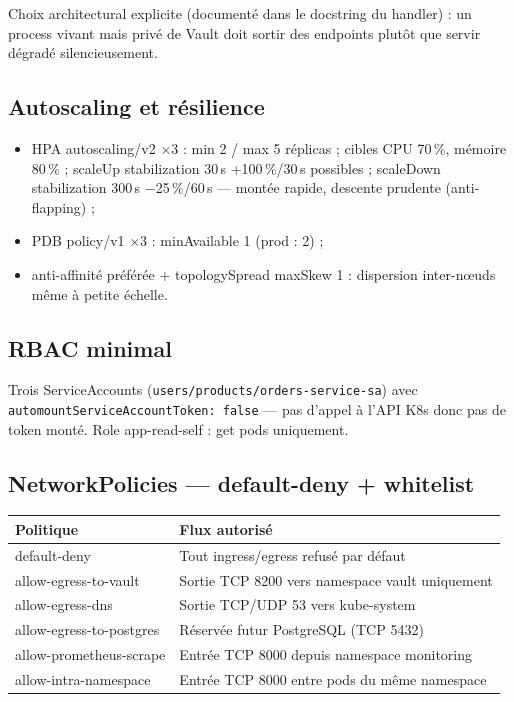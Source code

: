 \documentclass[12pt,a4paper]{article}
\begin{document}
Choix architectural explicite (documenté dans le docstring du handler) : un process vivant mais privé de Vault doit sortir des endpoints plutôt que servir dégradé silencieusement.

\subsection{Autoscaling et résilience}
\begin{itemize}[itemsep=1pt]
  \item HPA autoscaling/v2 ×3 : min 2 / max 5 réplicas ; cibles CPU 70\,\%, mémoire 80\,\% ; scaleUp stabilization 30\,s +100\,\%/30\,s possibles ; scaleDown stabilization 300\,s $-$25\,\%/60\,s --- montée rapide, descente prudente (anti-flapping) ;
  \item PDB policy/v1 ×3 : minAvailable 1 (prod : 2) ;
  \item anti-affinité préférée + topologySpread maxSkew 1 : dispersion inter-nœuds même à petite échelle.
\end{itemize}

\subsection{RBAC minimal}
Trois ServiceAccounts (\texttt{users/products/orders-service-sa}) avec \texttt{automountServiceAccountToken: false} --- pas d'appel à l'API K8s donc pas de token monté. Role app-read-self : get pods uniquement.

\subsection{NetworkPolicies --- default-deny + whitelist}
\begin{longtable}{@{}p{4.6cm}p{9.6cm}@{}}
\toprule
\textbf{Politique} & \textbf{Flux autorisé} \\
\midrule
\endhead
default-deny & Tout ingress/egress refusé par défaut \\
allow-egress-to-vault & Sortie TCP 8200 vers namespace vault uniquement \\
allow-egress-dns & Sortie TCP/UDP 53 vers kube-system \\
allow-egress-to-postgres & Réservée futur PostgreSQL (TCP 5432) \\
allow-prometheus-scrape & Entrée TCP 8000 depuis namespace monitoring \\
allow-intra-namespace & Entrée TCP 8000 entre pods du même namespace \\
\bottomrule
\end{longtable}
\end{document}
